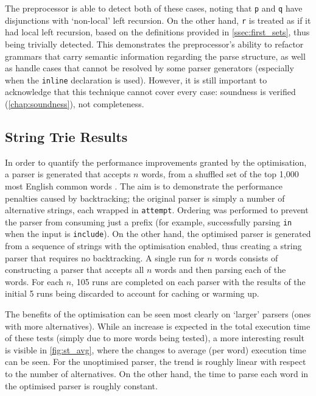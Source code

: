 The preprocessor is able to detect both of these cases, noting that \texttt{p} and \texttt{q} have disjunctions with `non-local' left recursion.
On the other hand, \texttt{r} is treated as if it had local left recursion, based on the definitions provided in \autoref{ssec:first_sets}, thus being trivially detected.
This demonstrates the preprocessor's ability to refactor grammars that carry semantic information regarding the parse structure, as well as handle cases that cannot be resolved by some parser generators (especially when the \texttt{inline} declaration is used).
However, it is still important to acknowledge that this technique cannot cover every case: soundness is verified (\autoref{chap:soundness}), not completeness.

\subsection{String Trie Results}
\label{ssec:string_trie_res}

In order to quantify the performance improvements granted by the optimisation, a parser is generated that accepts $n$ words, from a shuffled set of the top 1,000 most English common words \cite{ef1000}.
The aim is to demonstrate the performance penalties caused by backtracking; the original parser is simply a number of alternative strings, each wrapped in \texttt{attempt}.
Ordering was performed to prevent the parser from consuming just a prefix (for example, successfully parsing \texttt{in} when the input is \texttt{include}).
On the other hand, the optimised parser is generated from a sequence of strings with the optimisation enabled, thus creating a string parser that requires no backtracking.
A single run for $n$ words consists of constructing a parser that accepts all $n$ words and then parsing each of the words.
For each $n$, 105 runs are completed on each parser with the results of the initial 5 runs being discarded to account for caching or warming up.

The benefits of the optimisation can be seen most clearly on `larger' parsers (ones with more alternatives).
While an increase is expected in the total execution time of these tests (simply due to more words being tested), a more interesting result is visible in \autoref{fig:st_avg}, where the changes to average (per word) execution time can be seen.
For the unoptimised parser, the trend is roughly linear with respect to the number of alternatives.
On the other hand, the time to parse each word in the optimised parser is roughly constant.

